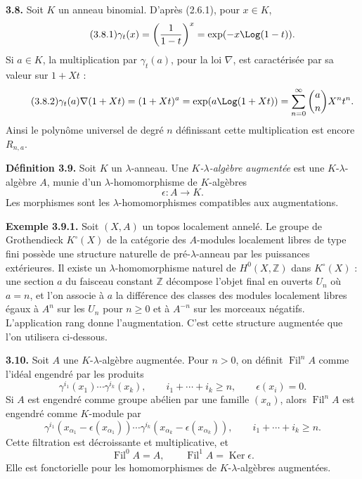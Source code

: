 \documentclass[11pt]{article}
\newcommand{\Fil}{\operatorname{Fil}}
\providecommand{\Ker}{\operatorname{Ker}}
\begin{document}
\textbf{3.8.} Soit \(K\) un anneau binomial. D'après (2.6.1), pour \(x\in K\),
\begin{equation}\tag{3.8.1}
  \gamma_t(x)=\left(\frac1{1-t}\right)^x
  =\exp(-x\Log(1-t)).
\end{equation}
Si \(a\in K\), la multiplication par \(\gamma_t(a)\), pour la loi \(\nabla\), est caractérisée par sa valeur sur \(1+Xt\) :
\begin{equation}\tag{3.8.2}
  \gamma_t(a)\nabla(1+Xt)
  =(1+Xt)^a
  =\exp(a\Log(1+Xt))
  =\sum_{n=0}^{\infty}\binom{a}{n}X^nt^n .
\end{equation}
Ainsi le polynôme universel de degré \(n\) définissant cette multiplication est encore \(R_{n,a}\).

\textbf{Définition 3.9.} Soit \(K\) un \(\lambda\)-anneau. Une \emph{\(K\)-\(\lambda\)-algèbre augmentée} est une \(K\)-\(\lambda\)-algèbre \(A\), munie d'un \(\lambda\)-homomorphisme de \(K\)-algèbres
\[
  \epsilon:A\longrightarrow K.
\]
Les morphismes sont les \(\lambda\)-homomorphismes compatibles aux augmentations.

\textbf{Exemple 3.9.1.} Soit \((X,A)\) un topos localement annelé. Le groupe de Grothendieck \(K^\circ(X)\) de la catégorie des \(A\)-modules localement libres de type fini possède une structure naturelle de pré-\(\lambda\)-anneau par les puissances extérieures. Il existe un \(\lambda\)-homomorphisme naturel de \(H^0(X,\mathbb Z)\) dans \(K^\circ(X)\) : une section \(a\) du faisceau constant \(\mathbb Z\) décompose l'objet final en ouverts \(U_n\) où \(a=n\), et l'on associe à \(a\) la différence des classes des modules localement libres égaux à \(A^n\) sur les \(U_n\) pour \(n\ge0\) et à \(A^{-n}\) sur les morceaux négatifs. L'application rang donne l'augmentation. C'est cette structure augmentée que l'on utilisera ci-dessous.

\textbf{3.10.} Soit \(A\) une \(K\)-\(\lambda\)-algèbre augmentée. Pour \(n>0\), on définit \(\Fil^n A\) comme l'idéal engendré par les produits
\begin{equation}\tag{3.10.1}
  \gamma^{i_1}(x_1)\cdots\gamma^{i_k}(x_k),
  \qquad i_1+\cdots+i_k\ge n,
  \qquad \epsilon(x_i)=0.
\end{equation}
Si \(A\) est engendré comme groupe abélien par une famille \((x_\alpha)\), alors \(\Fil^nA\) est engendré comme \(K\)-module par
\begin{equation}\tag{3.10.2}
  \gamma^{i_1}(x_{\alpha_1}-\epsilon(x_{\alpha_1}))\cdots
  \gamma^{i_k}(x_{\alpha_k}-\epsilon(x_{\alpha_k})),
  \qquad i_1+\cdots+i_k\ge n.
\end{equation}
Cette filtration est décroissante et multiplicative, et
\[
  \Fil^0A=A,
  \qquad \Fil^1A=\Ker\epsilon.
\]
Elle est fonctorielle pour les homomorphismes de \(K\)-\(\lambda\)-algèbres augmentées.
\end{document}
